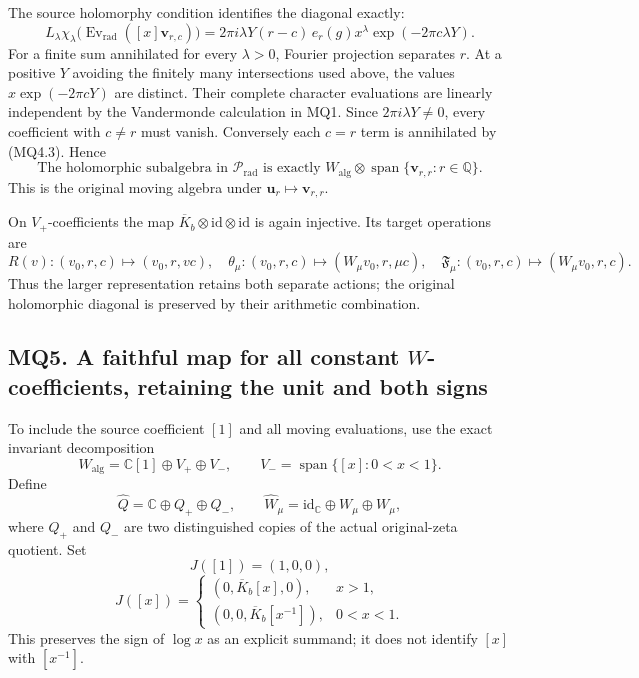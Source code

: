 The source holomorphy condition identifies the diagonal exactly: \[
L_\lambda\chi_\lambda
\bigl(\operatorname{Ev}_{\mathrm{rad}}([x]\mathbf v_{r,c})\bigr)
=2\pi i\lambda Y(r-c)\,
e_r(g)x^\lambda\exp(-2\pi c\lambda Y).
\tag{MQ4.3}
\] For a finite sum annihilated for every \(\lambda>0\), Fourier
projection separates \(r\). At a positive \(Y\) avoiding the finitely
many intersections used above, the values \(x\exp(-2\pi cY)\) are
distinct. Their complete character evaluations are linearly independent
by the Vandermonde calculation in MQ1. Since \(2\pi i\lambda Y\ne0\),
every coefficient with \(c\ne r\) must vanish. Conversely each \(c=r\)
term is annihilated by (MQ4.3). Hence \[
\boxed{\text{The holomorphic subalgebra in }\mathcal P_{\mathrm{rad}}
\text{ is exactly }W_{\mathrm{alg}}\otimes
\operatorname{span}\{\mathbf v_{r,r}:r\in\mathbb Q\}.}
\tag{MQ4.4}
\] This is the original moving algebra under
\(\mathbf u_r\mapsto\mathbf v_{r,r}\).

On \(V_+\)-coefficients the map
\(\overline K_b\otimes\mathrm{id}\otimes\mathrm{id}\) is again
injective. Its target operations are \[
R(v):(v_0,r,c)\mapsto(v_0,r,vc),\quad
\theta_\mu:(v_0,r,c)\mapsto(W_\mu v_0,r,\mu c),\quad
\mathfrak F_\mu:(v_0,r,c)\mapsto(W_\mu v_0,r,c).
\] Thus the larger representation retains both separate actions; the
original holomorphic diagonal is preserved by their arithmetic
combination.

\subsection{\texorpdfstring{MQ5. A faithful map for all constant
\(W\)-coefficients, retaining the unit and both
signs}{MQ5. A faithful map for all constant W-coefficients, retaining the unit and both signs}}\label{mq5.-a-faithful-map-for-all-constant-w-coefficients-retaining-the-unit-and-both-signs}

To include the source coefficient \([1]\) and all moving evaluations,
use the exact invariant decomposition \[
W_{\mathrm{alg}}=\mathbb C[1]\oplus V_+\oplus V_-,
\qquad V_-=\operatorname{span}\{[x]:0<x<1\}.
\] Define \[
\widehat Q=\mathbb C\oplus Q_+\oplus Q_-,
\qquad \widehat W_\mu=\mathrm{id}_{\mathbb C}\oplus W_\mu\oplus W_\mu,
\] where \(Q_+\) and \(Q_-\) are two distinguished copies of the actual
original-zeta quotient. Set \[
J([1])=(1,0,0),
\] \[
J([x])=
\begin{cases}
(0,\overline K_b[x],0),&x>1,\\
(0,0,\overline K_b[x^{-1}]),&0<x<1.
\end{cases}
\tag{MQ5.1}
\] This preserves the sign of \(\log x\) as an explicit summand; it does
not identify \([x]\) with \([x^{-1}]\).

